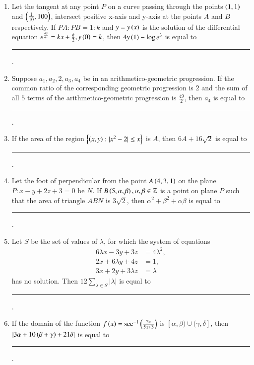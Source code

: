 \documentclass[journal]{IEEEtran}
\begin{document}
\begin{enumerate}[start = 16]


\item Let the tangent at any point $P$ on a curve passing through the points $\left(1,1\right)$ and $\left(\frac{1}{10},100\right)$, intersect positive x-axis and y-axis at the points $A$ and $B$ respectively. If $PA : PB = 1 : k$ and $y=y\left(x\right)$ is the solution of the differential equation $e^{\frac{dy}{dx}} = kx + \frac{k}{2}, y\left(0\right) = k$, then $4y\left(1\right) -\log e^3$ is equal to \rule{2cm}{0.4mm}.

\item Suppose $a_1, a_2, 2, a_3, a_4$ be in an arithmetico-geometric progression. If the common ratio of the corresponding geometric progression is $2$ and the sum of all $5$ terms of the arithmetico-geometric progression is $\frac{49}{2}$, then $a_4$ is equal to \rule{2cm}{0.4mm}.

\item If the area of the region $\left\{\left(x,y\right) : |x^2-2| \le x\right\}$ is $A$, then $6A + 16\sqrt{2}$ is equal to \rule{2cm}{0.4mm}.

\item Let the foot of perpendicular from the point $A \left(4,3,1\right)$ on the plane $P : x - y + 2z +3 = 0$ be $N$. If $B\left(5,\alpha,\beta\right), \alpha, \beta \in \mathbb{Z}$ is a point on plane $P$ such that the area of triangle $ABN$ is $3\sqrt{2}$, then $\alpha^2 + \beta^2 +\alpha\beta $ is equal to \rule{2cm}{0.4mm}.

\item Let $S$ be the set of values of $\lambda$, for which the system of equations 
\begin{align}
	6\lambda x - 3y + 3z &= 4\lambda^2, \\
	2x + 6\lambda y + 4z &= 1, \\
	3x + 2y + 3\lambda z &= \lambda 
\end{align}
has no solution. Then $12 \sum_{\lambda \in S} |\lambda|$ is equal to \rule{2cm}{0.4mm}. 

\item If the domain of the function $f\left(x\right) = \sec^{-1}\left(\frac{2x}{5x+3}\right)$ is $[\alpha,\beta) \cup (\gamma,\delta]$, then $|3\alpha +10\left(\beta + \gamma\right) + 21\delta|$ is equal to \rule{2cm}{0.4mm}.


\end{enumerate}
\end{document}
